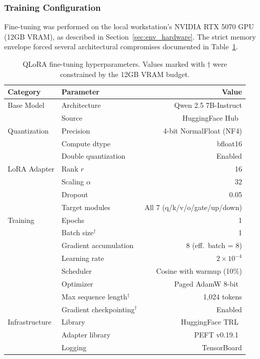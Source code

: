 \subsubsection{Training Configuration}

Fine-tuning was performed on the local workstation's NVIDIA RTX 5070 GPU (12GB VRAM), as described in Section~\ref{sec:env_hardware}. The strict memory envelope forced several architectural compromises documented in Table~\ref{tab:qlora_training_config}.

\begin{table}[H]
    \centering
    \caption[QLoRA Fine-Tuning Hyperparameters]{QLoRA fine-tuning hyperparameters. Values marked with $\dagger$ were constrained by the 12GB VRAM budget.}
    \label{tab:qlora_training_config}
    \begin{tabular}{@{}llr@{}}
        \toprule
        \textbf{Category} & \textbf{Parameter} & \textbf{Value} \\
        \midrule
        Base Model & Architecture & Qwen 2.5 7B-Instruct \\
        & Source & HuggingFace Hub~\parencite{Wolf_Debut_Sanh_Chaumond_Delangue_Moi_Cistac_Rault_Louf_Funtowicz_et_al._2020} \\
        \midrule
        Quantization & Precision & 4-bit NormalFloat (NF4) \\
        & Compute dtype & bfloat16 \\
        & Double quantization & Enabled \\
        \midrule
        LoRA Adapter & Rank $r$ & 16 \\
        & Scaling $\alpha$ & 32 \\
        & Dropout & 0.05 \\
        & Target modules & All 7 (q/k/v/o/gate/up/down) \\
        \midrule
        Training & Epochs & 1 \\
        & Batch size$^\dagger$ & 1 \\
        & Gradient accumulation & 8 (eff.\ batch = 8) \\
        & Learning rate & $2 \times 10^{-4}$ \\
        & Scheduler & Cosine with warmup (10\%) \\
        & Optimizer & Paged AdamW 8-bit~\parencite{bitsandbytes} \\
        & Max sequence length$^\dagger$ & 1,024 tokens \\
        & Gradient checkpointing$^\dagger$ & Enabled \\
        \midrule
        Infrastructure & Library & HuggingFace TRL~\parencite{trl} \\
        & Adapter library & PEFT v0.19.1~\parencite{peft} \\
        & Logging & TensorBoard \\
        \bottomrule
    \end{tabular}
\end{table}

